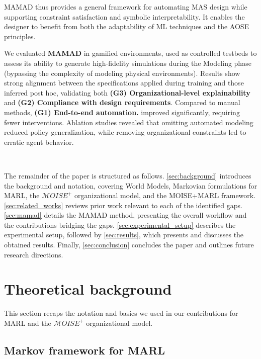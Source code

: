 \documentclass[pdflatex,sn-mathphys-num]{sn-jnl}%
\theoremstyle{thmstyleone}%
\theoremstyle{thmstyletwo}%
\theoremstyle{thmstylethree}%
\begin{document}
\noindent MAMAD thus provides a general framework for automating MAS design while supporting constraint satisfaction and symbolic interpretability. It enables the designer to benefit from both the adaptability of ML techniques and the AOSE principles.



We evaluated \textbf{MAMAD} in gamified environments, used as controlled testbeds to assess its ability to generate high-fidelity simulations during the Modeling phase (bypassing the complexity of modeling physical environments). Results show strong alignment between the specifications applied during training and those inferred post hoc, validating both \textbf{(G3) Organizational-level explainability} and \textbf{(G2) Compliance with design requirements}. Compared to manual methods, \textbf{(G1) End-to-end automation.} improved significantly, requiring fewer interventions. Ablation studies revealed that omitting automated modeling reduced policy generalization, while removing organizational constraints led to erratic agent behavior.

\

\noindent The remainder of the paper is structured as follows. \autoref{sec:background} introduces the background and notation, covering World Models, Markovian formulations for MARL, the $\mathcal{M}OISE^+$ organizational model, and the MOISE+MARL framework. \autoref{sec:related_works} reviews prior work relevant to each of the identified gaps. \autoref{sec:mamad} details the MAMAD method, presenting the overall workflow and the contributions bridging the gaps. \autoref{sec:experimental_setup} describes the experimental setup, followed by \autoref{sec:results}, which presents and discusses the obtained results. Finally, \autoref{sec:conclusion} concludes the paper and outlines future research directions.


\section{Theoretical background}\label{sec:background}

This section recaps the notation and basics we used in our contributions for MARL and the $\mathcal{M}OISE^+$ organizational model.

\subsection{Markov framework for MARL}
\end{document}
